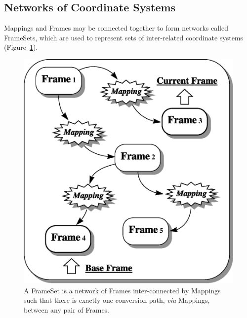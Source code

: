 \documentclass[twoside,11pt]{article}
\newenvironment{latexonly}{}{}
\newcommand{\htmlref}[2]{#1}
\begin{document}
\subsection{Networks of Coordinate Systems}

\begin{latexonly}
   Mappings and Frames may be connected together to form networks called
   FrameSets, which are used to represent sets of inter-related
   coordinate systems (Figure~\ref{fig:frameset}).
   \begin{figure}
   \begin{center}
   \includegraphics[scale=0.75]{sun211_figures/frameset.eps}
   \caption{A \htmlref{FrameSet}{FrameSet} is a network of Frames inter-connected by Mappings
   such that there is exactly one conversion path, {\em{via}} Mappings,
   between any pair of Frames.}
   \label{fig:frameset}
   \end{center}
   \end{figure}
\end{latexonly}
\end{document}
